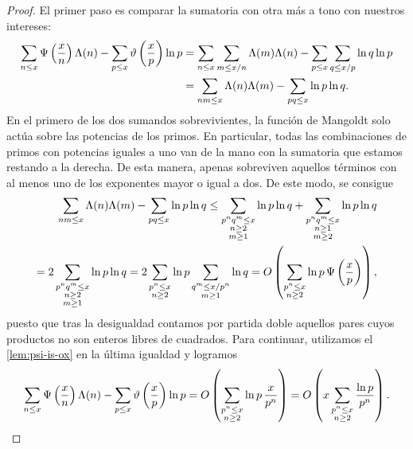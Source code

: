 \begin{proof}
  El primer paso es comparar la sumatoria con otra m\'as a tono con nuestros intereses:
  \begin{align*}
    \sum_{n \leq x} \Psi \left( \frac{x}{n} \right) \Lambda(n)
    - \sum_{p \leq x} \vartheta \left( \frac{x}{p} \right) \ln p
    &= \sum_{n \leq x} \sum_{m \leq x/n} \Lambda(m) \Lambda(n)
    - \sum_{p \leq x} \sum_{q \leq x / p} \ln q \ln p \\
    &= \sum_{nm \leq x} \Lambda(n) \Lambda(m)
    - \sum_{pq \leq x} \ln p \ln q.
  \end{align*}
  En el primero de los dos sumandos sobrevivientes,
  la funci\'on de Mangoldt solo act\'ua sobre las potencias de los primos.
  En particular, todas las combinaciones de primos con potencias iguales a uno
  van de la mano con la sumatoria que estamos restando a la derecha.
  De esta manera, apenas sobreviven aquellos t\'erminos
  con al menos uno de los exponentes mayor o igual a dos.
  De este modo, se consigue
  \begin{align*}
    \sum_{nm \leq x} \Lambda(n) \Lambda(m)
    - \sum_{pq \leq x} \ln p \ln q
    \leq \sum_{\substack{p^n q^m \leq x \\ n \geq 2 \\ m \geq 1}} \ln p \ln q
    + \sum_{\substack{p^n q^m \leq x \\ n \geq 1 \\ m \geq 2}} \ln p \ln q \\
    = 2 \sum_{\substack{p^n q^m \leq x \\ n \geq 2 \\ m \geq 1}} \ln p \ln q
    = 2 \sum_{\substack{p^n \leq x \\ n \geq 2}} \ln p \sum_{\substack{q^m \leq x / p^n \\ m \geq 1}} \ln q
    = O\left( \sum_{\substack{p^n \leq x \\ n \geq 2}} \ln p \, \Psi\left( \frac{x}{p} \right) \right),
  \end{align*}
  puesto que tras la desigualdad contamos por partida doble
  aquellos pares cuyos productos no son enteros libres de cuadrados.
  Para continuar, utilizamos el \cref{lem:psi-is-ox} en la \'ultima igualdad y logramos 
  \[
    \sum_{n \leq x} \Psi\left( \frac{x}{n} \right)\Lambda(n)
    - \sum_{p \leq x} \vartheta\left( \frac{x}{p} \right) \ln p
    = O\left( \sum_{\substack{p^n \leq x \\ n \geq 2}} \ln p \, \frac{x}{p^n} \right)
    = O\left( x \sum_{\substack{p^n \leq x \\ n \geq 2}} \frac{\ln p}{p^n} \right).
  \]
  

\end{proof}

